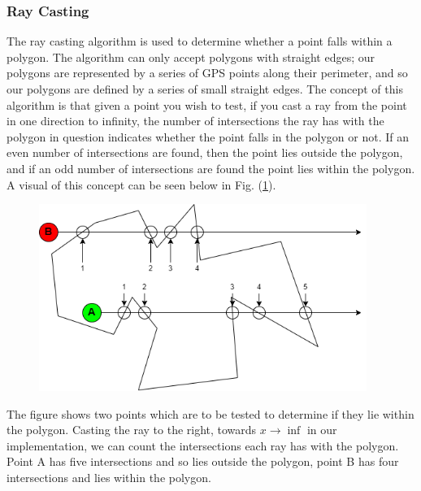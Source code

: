 \documentclass[11pt,landscape]{article}
\begin{document}
\begin{multicols}{3}
\subsubsection{Ray Casting}
The ray casting algorithm is used to determine whether a point falls within a
polygon. The algorithm can only accept polygons with straight edges; our polygons are
represented by a series of GPS points along their perimeter, and so our polygons
are defined by a series of small straight edges. The concept of this algorithm
is that given a point you wish to test, if you cast a ray from the point in one
direction to infinity, the number of intersections the ray has with the polygon
in question indicates whether the point falls in the polygon or not. If an even
number of intersections are found, then the point lies outside the polygon, and
if an odd number of intersections are found the point lies within the polygon.
A visual of this concept can be seen below in Fig. (\ref{fig:raycasting}).
\begin{figure}[H]
    \begin{mdframed}
        \begin{center}
            \includegraphics[width=0.95\textwidth]{raycasting.png}
        \end{center}
    \end{mdframed}
    \label{fig:raycasting}
\end{figure}

The figure shows two points which are to be tested to determine if they lie
within the polygon. Casting the ray to the right, towards $x\rightarrow\inf$ in
our implementation, we can count the intersections each ray has with the
polygon. Point A has five intersections and so lies outside the polygon, point B
has four intersections and lies within the polygon. 


\end{multicols}
\end{document}
